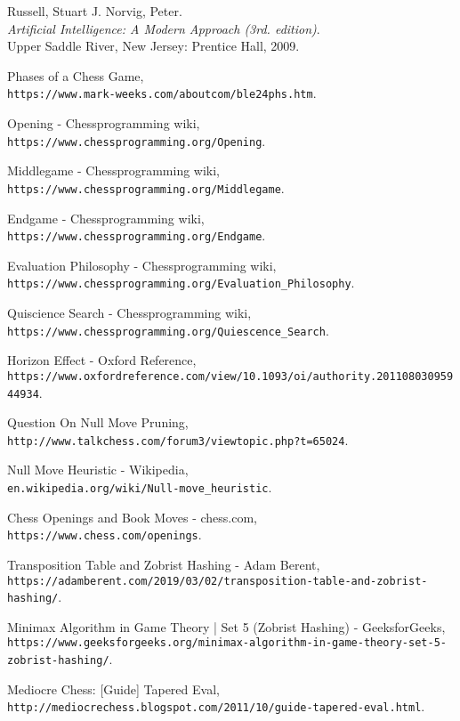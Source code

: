 \documentclass[]{article}
\begin{document}
\newpage
\begin{thebibliography}{}

Russell, Stuart J. Norvig, Peter.\\
\textit{Artificial Intelligence: A Modern Approach (3rd. edition)}. \\
Upper Saddle River, New Jersey: Prentice Hall, 2009.

Phases of a Chess Game,
\\\texttt{https://www.mark-weeks.com/aboutcom/ble24phs.htm}.

Opening - Chessprogramming wiki,
\\\texttt{https://www.chessprogramming.org/Opening}.

Middlegame - Chessprogramming wiki,
\\\texttt{https://www.chessprogramming.org/Middlegame}.

Endgame - Chessprogramming wiki,
\\\texttt{https://www.chessprogramming.org/Endgame}.

Evaluation Philosophy - Chessprogramming wiki,
\\\texttt{https://www.chessprogramming.org/Evaluation\_Philosophy}.

Quiscience Search - Chessprogramming wiki,
\\\texttt{https://www.chessprogramming.org/Quiescence\_Search}.

Horizon Effect - Oxford Reference,
\\\texttt{https://www.oxfordreference.com/view/10.1093/oi/authority.20110803095944934}.

Question On Null Move Pruning,
\\\texttt{http://www.talkchess.com/forum3/viewtopic.php?t=65024}. 

Null Move Heuristic - Wikipedia,
\\\texttt{en.wikipedia.org/wiki/Null-move\_heuristic}.

Chess Openings and Book Moves - chess.com,
\\\texttt{https://www.chess.com/openings}.

Transposition Table and Zobrist Hashing - Adam Berent,
\\\texttt{https://adamberent.com/2019/03/02/transposition-table-and-zobrist-hashing/}.

Minimax Algorithm in Game Theory | Set 5 (Zobrist Hashing) - GeeksforGeeks,
\\\texttt{https://www.geeksforgeeks.org/minimax-algorithm-in-game-theory-set-5-zobrist-hashing/}.

Mediocre Chess: [Guide] Tapered Eval,
\\\texttt{http://mediocrechess.blogspot.com/2011/10/guide-tapered-eval.html}.
\end{thebibliography}
\end{document}
